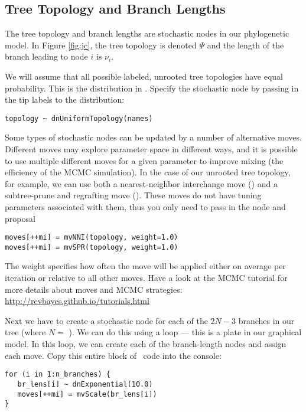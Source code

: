 \subsection{Tree Topology and Branch Lengths}

The tree topology and branch lengths are stochastic nodes in our phylogenetic model. 
In Figure \ref{fig:jc}, the tree topology is denoted $\Psi$ and the length of the branch leading to node $i$ is $\nu_i$.

We will assume that all possible labeled, unrooted tree topologies have equal probability. This is the  distribution in \RevBayes. Specify the  stochastic node by passing in the tip labels  to the  distribution:
{\tt \begin{snugshade*}
\begin{lstlisting}
topology ~ dnUniformTopology(names)
\end{lstlisting}
\end{snugshade*}}

Some types of stochastic nodes can be updated by a number of alternative moves. 
Different moves may explore parameter space in different ways, and it is possible to use multiple different moves for a given parameter to improve mixing (the efficiency of the MCMC simulation). 
In the case of our unrooted tree topology, for example, we can use both a nearest-neighbor interchange move () and a subtree-prune and regrafting move (). 
These moves do not have tuning parameters associated with them, thus you only need to pass in the  node and proposal  
{\tt \begin{snugshade*}
\begin{lstlisting}
moves[++mi] = mvNNI(topology, weight=1.0)
moves[++mi] = mvSPR(topology, weight=1.0)
\end{lstlisting}
\end{snugshade*}}
The weight specifies how often the move will be applied either on average per iteration or relative to all other moves.
Have a look at the MCMC tutorial for more details about moves and MCMC strategies: \href{http://revbayes.github.io/tutorials.html}{http://revbayes.github.io/tutorials.html}


Next we have to create a stochastic node for each of the $2N-3$ branches in our tree (where $N=$ ). 
We can do this using a  loop --- this is a plate in our graphical model. In this loop, we can create each of the branch-length nodes and assign each move. 
Copy this entire block of \Rev~code into the console:
{\tt \small \begin{snugshade*}
\begin{lstlisting}
for (i in 1:n_branches) {
   br_lens[i] ~ dnExponential(10.0)
   moves[++mi] = mvScale(br_lens[i]) 
}
\end{lstlisting}
\end{snugshade*}}

